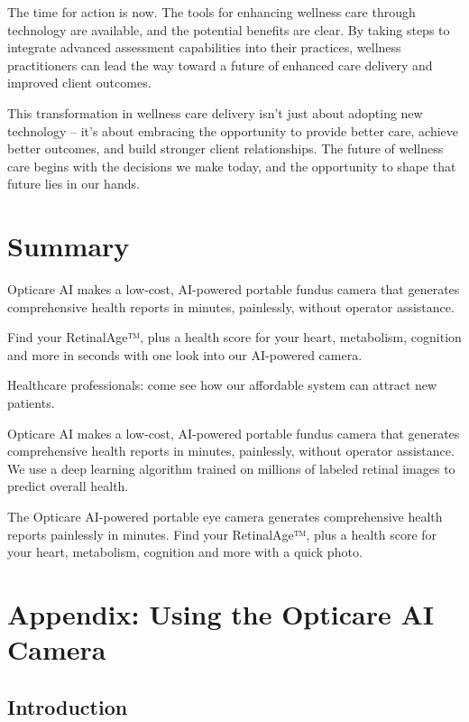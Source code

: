\documentclass[
  Letterpaper,
]{scrbook}
\begin{document}
The time for action is now. The tools for enhancing wellness care
through technology are available, and the potential benefits are clear.
By taking steps to integrate advanced assessment capabilities into their
practices, wellness practitioners can lead the way toward a future of
enhanced care delivery and improved client outcomes.

This transformation in wellness care delivery isn't just about adopting
new technology -- it's about embracing the opportunity to provide better
care, achieve better outcomes, and build stronger client relationships.
The future of wellness care begins with the decisions we make today, and
the opportunity to shape that future lies in our hands.


\chapter{Summary}\label{summary}

Opticare AI makes a low-cost, AI-powered portable fundus camera that
generates comprehensive health reports in minutes, painlessly, without
operator assistance.

Find your RetinalAge™, plus a health score for your heart, metabolism,
cognition and more in seconds with one look into our AI-powered camera.

Healthcare professionals: come see how our affordable system can attract
new patients.

Opticare AI makes a low-cost, AI-powered portable fundus camera that
generates comprehensive health reports in minutes, painlessly, without
operator assistance. We use a deep learning algorithm trained on
millions of labeled retinal images to predict overall health.

The Opticare AI-powered portable eye camera generates comprehensive
health reports painlessly in minutes. Find your RetinalAge™, plus a
health score for your heart, metabolism, cognition and more with a quick
photo.


\chapter{Appendix: Using the Opticare AI
Camera}\label{appendix-using-the-opticare-ai-camera}

\section{Introduction}\label{introduction-3}
\end{document}
